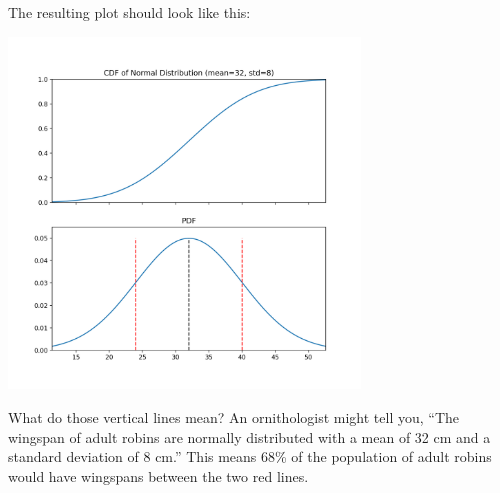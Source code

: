 The resulting plot should look like this:

\includegraphics[width=0.7\textwidth]{norm_32_8.png}

What do those vertical lines mean?  An ornithologist might tell you, ``The wingspan of adult robins are normally distributed with a mean of 32 cm and a
 standard deviation of 8 cm.''  This means 68\% of the population of adult robins would have wingspans between the two red lines.
 
